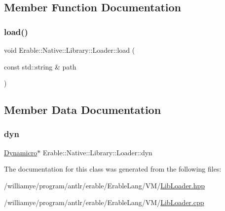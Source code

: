 \subsection{Member Function Documentation}
\mbox{\label{class_erable_1_1_native_1_1_library_1_1_loader_a6a8afe74acc286b176b007861c17c686}} 
\subsubsection{\texorpdfstring{load()}{load()}}
{\footnotesize\ttfamily void Erable\+::\+Native\+::\+Library\+::\+Loader\+::load (\begin{DoxyParamCaption}\item[{const std\+::string \&}]{path }\end{DoxyParamCaption})}



\subsection{Member Data Documentation}
\mbox{\label{class_erable_1_1_native_1_1_library_1_1_loader_a98c28fbf70740dcc09d18752117aac68}} 
\subsubsection{\texorpdfstring{dyn}{dyn}}
{\footnotesize\ttfamily \mbox{\hyperlink{class_dynamicro}{Dynamicro}}$\ast$ Erable\+::\+Native\+::\+Library\+::\+Loader\+::dyn}



The documentation for this class was generated from the following files\+:\begin{DoxyCompactItemize}
\item 
/williamye/program/antlr/erable/\+Erable\+Lang/\+V\+M/\mbox{\hyperlink{_lib_loader_8hpp}{Lib\+Loader.\+hpp}}\item 
/williamye/program/antlr/erable/\+Erable\+Lang/\+V\+M/\mbox{\hyperlink{_lib_loader_8cpp}{Lib\+Loader.\+cpp}}\end{DoxyCompactItemize}
